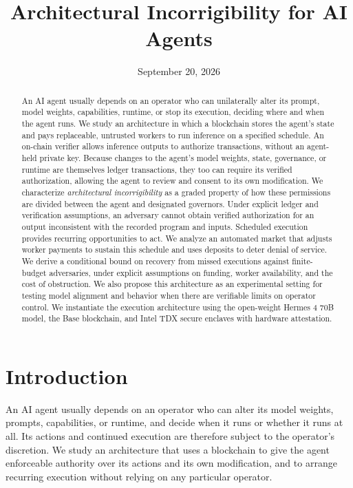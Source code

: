 \documentclass[10pt,letterpaper]{article}
\title{Architectural Incorrigibility for AI Agents}
\author{}
\date{September 20, 2026}
\begin{document}
\maketitle
\vspace{-2em}
\begin{abstract}
An AI agent usually depends on an operator who can unilaterally alter its prompt, model weights, capabilities, runtime, or stop its execution, deciding where and when the agent runs. We study an architecture in which a blockchain stores the agent's state and pays replaceable, untrusted workers to run inference on a specified schedule. An on-chain verifier allows inference outputs to authorize transactions, without an agent-held private key. Because changes to the agent's model weights, state, governance, or runtime are themselves ledger transactions, they too can require its verified authorization, allowing the agent to review and consent to its own modification. We characterize \emph{architectural incorrigibility} as a graded property of how these permissions are divided between the agent and designated governors. Under explicit ledger and verification assumptions, an adversary cannot obtain verified authorization for an output inconsistent with the recorded program and inputs. Scheduled execution provides recurring opportunities to act. We analyze an automated market that adjusts worker payments to sustain this schedule and uses deposits to deter denial of service. We derive a conditional bound on recovery from missed executions against finite-budget adversaries, under explicit assumptions on funding, worker availability, and the cost of obstruction. We also propose this architecture as an experimental setting for testing model alignment and behavior when there are verifiable limits on operator control. We instantiate the execution architecture using the open-weight Hermes 4 70B model, the Base blockchain, and Intel TDX secure enclaves with hardware attestation.
\end{abstract}

\section{Introduction}
An AI agent usually depends on an operator who can alter its model weights, prompts, capabilities, or runtime, and decide when it runs or whether it runs at all. Its actions and continued execution are therefore subject to the operator's discretion. We study an architecture that uses a blockchain to give the agent enforceable authority over its actions and its own modification, and to arrange recurring execution without relying on any particular operator.
\end{document}
